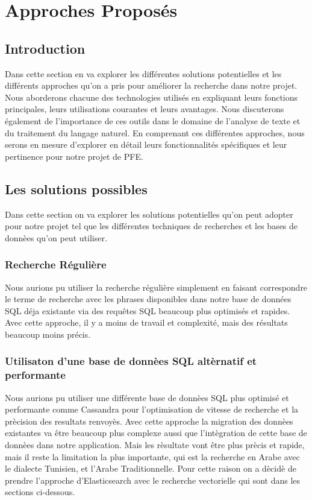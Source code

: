 \chapter{Approches Proposés}
\localtableofcontents

\newpage
\section{Introduction}
\noindent
Dans cette section en va explorer les différentes solutions potentielles et les différents approches qu'on a pris pour améliorer la recherche dans notre projet. Nous aborderons chacune des technologies utilisés en expliquant leurs fonctions principales, leurs utilisations courantes et leurs avantages. Nous discuterons également de l'importance de ces outils dans le domaine de l'analyse de texte et du traitement du langage naturel. En comprenant ces différentes approches, nous serons en mesure d'explorer en détail leurs fonctionnalités spécifiques et leur pertinence pour notre projet de PFE.

\section{Les solutions possibles}
\noindent
Dans cette section on va explorer les solutions potentielles qu'on peut adopter pour notre projet tel que les différentes techniques de recherches et les bases de donnèes qu'on peut utiliser. 

\subsection{Recherche Régulière}
\noindent
Nous aurions pu utiliser la recherche régulière simplement en faisant correspondre le terme de recherche avec les phrases disponibles dans notre base de données SQL déja existante via des requêtes SQL beaucoup plus optimisés et rapides. Avec cette approche, il y a moins de travail et complexité, mais des résultats beaucoup moins précis.

\subsection{Utilisaton d'une base de donnèes SQL altèrnatif et performante}
\noindent
Nous aurions pu utiliser une différente base de donnèes SQL plus optimisé et performante comme Cassandra pour l'optimisation de vitesse de recherche et la prècision des resultats renvoyès. Avec cette approche la migration des donnèes existantes va être beaucoup plus complexe aussi que l'intègration de cette base de donnèes dans notre application. Mais les rèsultate vont être plus prècis et rapide, mais il reste la limitation la plus importante, qui est la recherche en Arabe avec le dialecte Tunisien, et l'Arabe Traditionnelle. Pour cette raison on a dècidè de prendre l'approche d'Elasticsearch avec le recherche vectorielle qui sont dans les sections ci-dessous.

